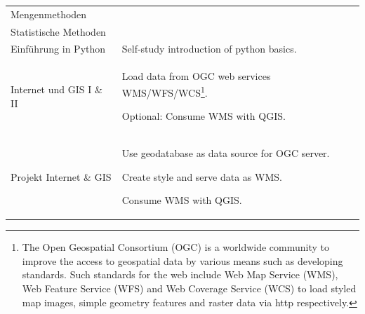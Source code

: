\documentclass[11pt, a4paper, oneside, parskip=full-]{scrartcl}
\begin{document}
\begin{table}[!htbp]
\begin{tabularx}{\textwidth}{lX}
    \cmidrule(r){1-1} Mengenmethoden &  \\
    \cmidrule(r){1-1} Statistische Methoden &  \\
    \midrule
    Einführung in Python & Self-study introduction of python basics. \\
    \midrule
    Internet und GIS I \& II &
      \begin{itemize}[left=0pt,nosep,before={\begin{minipage}[t]{\hsize}},after
      ={\end{minipage}}]
      \item Load data from OGC web services WMS/WFS/WCS\footnote{The Open
      Geospatial Consortium (OGC) is a worldwide community to improve the access
      to geospatial data by various means such as developing standards. Such
      standards for the web include Web Map Service (WMS), Web Feature Service
      (WFS) and Web Coverage Service (WCS) to load styled map images, simple
      geometry features and raster data via http respectively.}.
      \item Optional: Consume WMS with QGIS. \end{itemize}\nointerlineskip \\
    \midrule
    Projekt Internet \& GIS &
      \begin{itemize}[left=0pt,nosep,before={\begin{minipage}[t]{\hsize}},after
      ={\end{minipage}}]
      \item Use geodatabase as data source for OGC server.
      \item Create style and serve data as WMS.
      \item Consume WMS with QGIS. \end{itemize}\nointerlineskip \\
    \bottomrule
  \end{tabularx}%
\end{table}%

\end{document}
